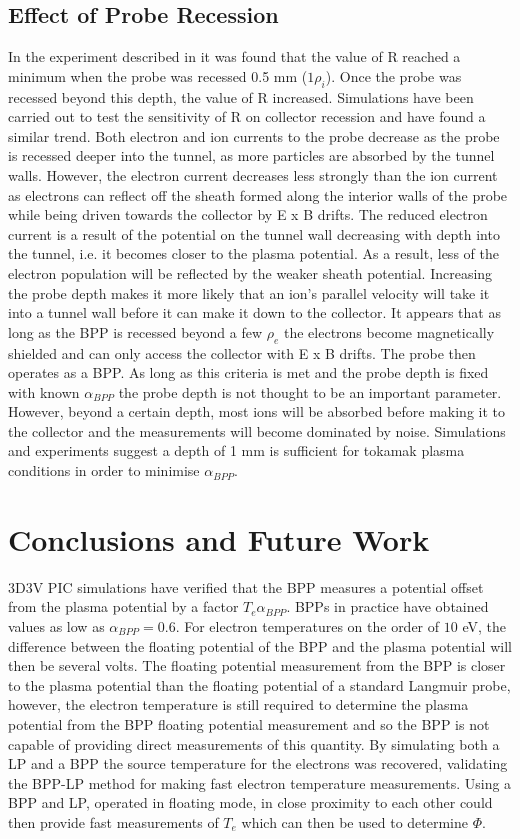 \subsection{Effect of Probe Recession}
In the experiment described in \cite{BPP} it was found that the value of R reached a minimum when the probe was recessed 0.5 mm ($1\rho_i$). Once the probe was recessed beyond this depth, the value of R increased. Simulations have been carried out to test the sensitivity of R on collector recession and have found a similar trend. Both electron and ion currents to the probe decrease as the probe is recessed deeper into the tunnel, as more particles are absorbed by the tunnel walls. However, the electron current decreases less strongly than the ion current as electrons can reflect off the sheath formed along the interior walls of the probe while being driven towards the collector by E x B drifts. The reduced electron current is a result of the potential on the tunnel wall decreasing with depth into the tunnel, i.e. it becomes closer to the plasma potential. As a result, less of the electron population will be reflected by the weaker sheath potential. Increasing the probe depth makes it more likely that an ion's parallel velocity will take it into a tunnel wall before it can make it down to the collector. It appears that as long as the BPP is recessed beyond a few $\rho_e$ the electrons become magnetically shielded and can only access the collector with E x B drifts. The probe then operates as a BPP. As long as this criteria is met and the probe depth is fixed with known $\alpha_{BPP}$  the probe depth is not thought to be an important parameter. However, beyond a certain depth, most ions will be absorbed before making it to the collector and the measurements will become dominated by noise. Simulations and experiments suggest a depth of 1 mm is sufficient for tokamak plasma conditions in order to minimise $\alpha_{BPP}$.   
 




\section{Conclusions and Future Work}
3D3V PIC simulations have verified that the BPP measures a potential offset from the plasma potential by a factor $T_e \alpha_{BPP}$. BPPs in practice have obtained values as low as $\alpha_{BPP} =0.6$. For electron temperatures on the order of $10$ eV, the difference between the floating potential of the BPP and the plasma potential will then be several volts.  The floating potential measurement from the BPP is closer to the plasma potential than the floating potential of a standard Langmuir probe, however, the electron temperature is still required to determine the plasma potential from the BPP floating potential measurement and so the BPP is not capable of providing direct measurements of this quantity. By simulating both a LP and a BPP the source temperature for the electrons was recovered, validating the BPP-LP method for making fast electron temperature measurements. Using a BPP and LP, operated in floating mode, in close proximity to each other could then provide fast measurements of $T_e$ which can then be used to determine $\Phi$.

